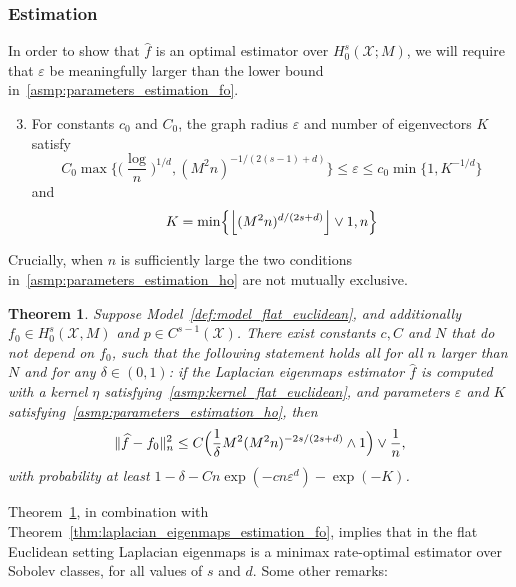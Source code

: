 \documentclass[aos]{imsart}
\theoremstyle{plain}
\newtheorem{theorem}{Theorem}
\theoremstyle{definition}
\theoremstyle{remark}
\newcommand{\wh}[1]{\widehat{#1}}
\newcommand{\mc}[1]{\mathcal{#1}}
\newcommand{\floor}[1]{\left\lfloor #1 \right\rfloor}
\newcommand{\1}{\mathbf{1}}
\begin{document}
\subsubsection{Estimation}
In order to show that $\wh{f}$ is an optimal estimator over $H_0^s(\mc{X};M)$, we will require that $\varepsilon$ be meaningfully larger than the lower bound in~\ref{asmp:parameters_estimation_fo}.
\begin{enumerate}[label=(P\arabic*)]
	\setcounter{enumi}{2}
	\item 
	\label{asmp:parameters_estimation_ho}
	For constants $c_0$ and $C_0$, the graph radius $\varepsilon$ and number of eigenvectors $K$ satisfy
	\begin{equation}
	\label{eqn:radius_ho}
	C_0\max\biggl\{\biggl(\frac{\log}{n}\biggr)^{1/d}, (M^2n)^{-1/(2(s - 1) + d)}\biggr\} \leq \varepsilon \leq c_0\min\{1, K^{-1/d}\}
	\end{equation}
	and
	\begin{equation*}
	K = \min\Bigl\{\floor{(M^2n)^{d/(2s + d)}} \vee 1,n\Bigr\}
	\end{equation*}
\end{enumerate}
Crucially, when $n$ is sufficiently large the two conditions in~\ref{asmp:parameters_estimation_ho} are not mutually exclusive.
\begin{theorem}
	\label{thm:laplacian_eigenmaps_estimation_ho}
	Suppose Model~\ref{def:model_flat_euclidean}, and additionally $f_0 \in H_0^s(\mc{X},M)$ and $p \in C^{s - 1}(\mc{X})$. There exist constants $c,C$ and $N$ that do not depend on $f_0$, such that the following statement holds all for all $n$ larger than $N$ and for any $\delta \in (0,1)$: if the Laplacian eigenmaps estimator $\wh{f}$ is computed with a kernel $\eta$ satisfying~\ref{asmp:kernel_flat_euclidean}, and parameters $\varepsilon$ and $K$ satisfying~\ref{asmp:parameters_estimation_ho}, then
	\begin{equation}
	\label{eqn:laplacian_eigenmaps_estimation_ho}
	\|\wh{f} - f_0\|_n^2 \leq C\Bigl(\frac{1}{\delta}M^2(M^2n)^{-2s/(2s + d)} \wedge 1\Bigr) \vee \frac{1}{n},
	\end{equation}
	with probability at least $1 - \delta - Cn\exp(-cn\varepsilon^d) - \exp(-K)$.
\end{theorem}
Theorem~\ref{thm:laplacian_eigenmaps_estimation_ho}, in combination with Theorem~\ref{thm:laplacian_eigenmaps_estimation_fo}, implies that in the flat Euclidean setting Laplacian eigenmaps is a minimax rate-optimal estimator over Sobolev classes, for all values of $s$ and $d$. Some other remarks:
\end{document}
